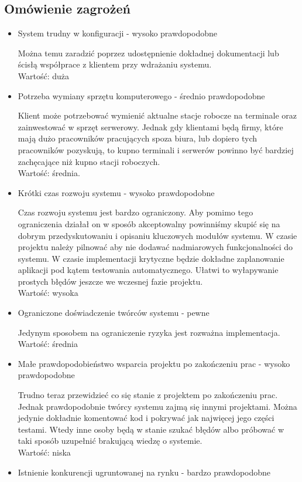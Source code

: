 \documentclass[../praca-dyplomowa.tex]{subfiles}
\begin{document}
\subsection{Omówienie zagrożeń}

\begin{itemize}
    \item System trudny w konfiguracji - wysoko prawdopodobne

          Można temu zaradzić poprzez udostępnienie dokładnej dokumentacji lub ścisłą współprace z klientem przy wdrażaniu systemu. \\
          Wartość: duża
    \item Potrzeba wymiany sprzętu komputerowego - średnio prawdopodobne

          Klient może potrzebować wymienić aktualne stacje robocze na terminale oraz zainwestować w sprzęt serwerowy. Jednak gdy klientami będą firmy, które mają dużo pracowników pracujących spoza biura, lub dopiero tych pracowników pozyskują, to kupno terminali i serwerów powinno być bardziej zachęcające niż kupno stacji roboczych.\\
          Wartość: średnia.
    \item Krótki czas rozwoju systemu - wysoko prawdopodobne

          Czas rozwoju systemu jest bardzo ograniczony. Aby pomimo tego ograniczenia działał on w sposób akceptowalny powinniśmy skupić się na dobrym przedyskutowaniu i opisaniu kluczowych modułów systemu. W czasie projektu należy pilnować aby nie dodawać nadmiarowych funkcjonalności do systemu. W czasie implementacji krytyczne będzie dokładne zaplanowanie aplikacji pod kątem testowania automatycznego. Ułatwi to wyłapywanie prostych błędów jeszcze we wczesnej fazie projektu.\\
          Wartość: wysoka
          \newpage
    \item Ograniczone doświadczenie twórców systemu - pewne

          Jedynym sposobem na ograniczenie ryzyka jest rozważna implementacja.\\
          Wartość: średnia
    \item Małe prawdopodobieństwo wsparcia projektu po zakończeniu prac - wysoko prawdopodobne

          Trudno teraz przewidzieć co się stanie z projektem po zakończeniu prac. Jednak prawdopodobnie twórcy systemu zajmą się innymi projektami. Można jedynie dokładnie komentować kod i pokrywać jak najwięcej jego części testami. Wtedy inne osoby będą w stanie szukać błędów albo próbować w taki sposób uzupełnić brakującą wiedzę o systemie.\\
          Wartość: niska
    \item Istnienie konkurencji ugruntowanej na rynku - bardzo prawdopodobne


\end{itemize}
\end{document}
